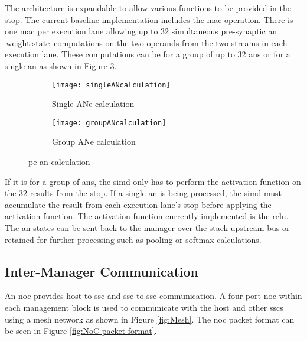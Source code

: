 The architecture is expandable to allow various functions to be provided in the \ac{stop}.
The current baseline implementation includes the \ac{mac} operation.
There is one \ac{mac} per execution lane allowing up to 32 simultaneous pre-synaptic \ac{an} $\mbox{weight} \cdot \mbox{state}$ computations on the two operands from the two streams in each execution lane.
These computations can be for a group of up to 32 \acp{an} or for a single \ac{an} as shown in Figure \ref{fig:PE AN calculation}.

\begin{figure}
\centering
  \begin{subfigure}{.49\textwidth}
    \centering
    \texttt{[image: singleANcalculation]}
    \captionsetup{justification=centering, skip=10pt}
    \caption{Single ANe calculation}
    \label{fig:Single AN calculation}
  \end{subfigure}%
  \begin{subfigure}{.49\textwidth}
    \centering
    \texttt{[image: groupANcalculation]}
    \captionsetup{justification=centering, skip=10pt}
    \caption{Group ANe calculation}
    \label{fig:Group AN calculation}
  \end{subfigure}%
\captionsetup{justification=centering, skip=16pt}
\caption{\ac{pe} \ac{an} calculation}
\label{fig:PE AN calculation}
\end{figure}

If it is for a group of \acp{an}, the \ac{simd} only has to perform the activation function on the 32 results from the \ac{stop}. 
If a single \ac{an} is being processed, the \ac{simd} must accumulate the result from each execution lane's \ac{stop} before applying the activation function.
The activation function currently implemented is the \ac{relu}.
The \ac{an} states can be sent back to the manager over the stack upstream bus or retained for further processing such as pooling or softmax calculations.

\subsection{Inter-Manager Communication}
\label{sec:Inter-Manager Communication}

An \ac{noc} provides host to \ac{ssc} and \ac{ssc} to \ac{ssc} communication.
A four port \ac{noc} within each management block is used to communicate with the host and other \acp{ssc} using a mesh network as shown in Figure \ref{fig:Mesh}.
The \ac{noc} packet format can be seen in Figure \ref{fig:NoC packet format}.

